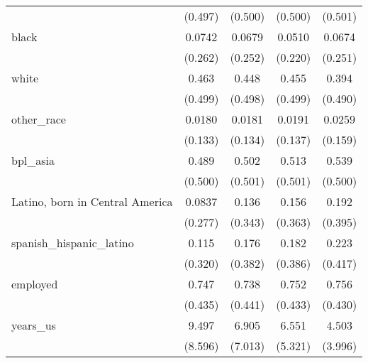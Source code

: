 \begin{table}[htbp]
\begin{tabular}{l*{4}{c}}
                    &     (0.497)         &     (0.500)         &     (0.500)         &     (0.501)         \\
[1em]
black               &      0.0742         &      0.0679         &      0.0510         &      0.0674         \\
                    &     (0.262)         &     (0.252)         &     (0.220)         &     (0.251)         \\
[1em]
white               &       0.463         &       0.448         &       0.455         &       0.394         \\
                    &     (0.499)         &     (0.498)         &     (0.499)         &     (0.490)         \\
[1em]
other\_race          &      0.0180         &      0.0181         &      0.0191         &      0.0259         \\
                    &     (0.133)         &     (0.134)         &     (0.137)         &     (0.159)         \\
[1em]
bpl\_asia            &       0.489         &       0.502         &       0.513         &       0.539         \\
                    &     (0.500)         &     (0.501)         &     (0.501)         &     (0.500)         \\
[1em]
Latino, born in Central America&      0.0837         &       0.136         &       0.156         &       0.192         \\
                    &     (0.277)         &     (0.343)         &     (0.363)         &     (0.395)         \\
[1em]
spanish\_hispanic\_latino&       0.115         &       0.176         &       0.182         &       0.223         \\
                    &     (0.320)         &     (0.382)         &     (0.386)         &     (0.417)         \\
[1em]
employed            &       0.747         &       0.738         &       0.752         &       0.756         \\
                    &     (0.435)         &     (0.441)         &     (0.433)         &     (0.430)         \\
[1em]
years\_us            &       9.497         &       6.905         &       6.551         &       4.503         \\
                    &     (8.596)         &     (7.013)         &     (5.321)         &     (3.996)         \\

\end{tabular}
\end{table}
